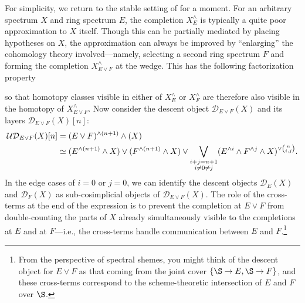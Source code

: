 For simplicity, we return to the stable setting of  for a moment.  For an arbitrary spectrum $X$ and ring spectrum $E$, the completion $X^\wedge_E$ is typically a quite poor approximation to $X$ itself.  Though this can be partially mediated by placing hypotheses on $X$, the approximation can always be improved by ``enlarging'' the cohomology theory involved---namely, selecting a second ring spectrum $F$ and forming the completion $X^\wedge_{E \vee F}$ at the wedge.  This has the following factorization property
\begin{center}
\end{center}
so that homotopy classes visible in either of $X^\wedge_E$ or $X^\wedge_F$ are therefore also visible in the homotopy of $X^\wedge_{E \vee F}$.  Now consider the descent object $\mathcal D_{E \vee F}(X)$ and its layers $\mathcal D_{E \vee F}(X)[n]$:
\begin{align*}
\mathcal{UD}_{E \vee F}(X)[n] & = (E \vee F)^{\wedge (n+1)} \wedge (X) \\
& \simeq (E^{\wedge (n+1)} \wedge X) \vee (F^{\wedge (n+1)} \wedge X) \vee \bigvee_{\substack{i+j=n+1 \\ i \ne 0 \ne j}} (E^{\wedge i} \wedge F^{\wedge j} \wedge X)^{\vee \binom{n}{i,j}}.
\end{align*}
In the edge cases of $i = 0$ or $j = 0$, we can identify the descent objects $\mathcal D_E(X)$ and $\mathcal D_F(X)$ as sub-cosimplicial objects of $\mathcal D_{E \vee F}(X)$.  The role of the cross-terms at the end of the expression is to prevent the completion at $E \vee F$ from double-counting the parts of $X$ already simultaneously visible to the completions at $E$ and at $F$---i.e., the cross-terms handle communication between $E$ and $F$.\footnote{From the perspective of spectral shemes, you might think of the descent object for $E \vee F$ as that coming from the joint cover $\{\S \to E, \S \to F\}$, and these cross-terms correspond to the scheme-theoretic intersection of $E$ and $F$ over $\S$.}

